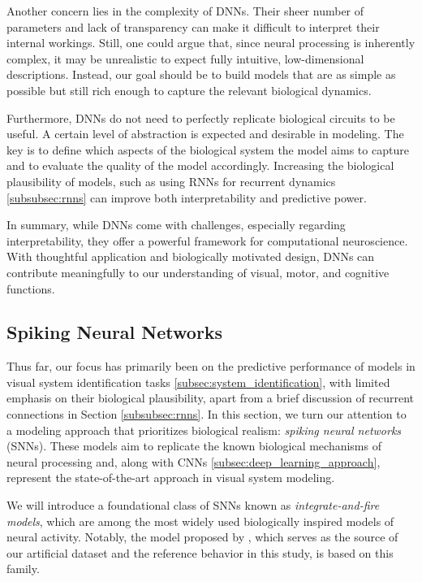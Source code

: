 Another concern lies in the complexity of DNNs. Their sheer number of parameters and lack of transparency can make it difficult to interpret their internal workings. Still, one could argue that, since neural processing is inherently complex, it may be unrealistic to expect fully intuitive, low-dimensional descriptions. Instead, our goal should be to build models that are as simple as possible but still rich enough to capture the relevant biological dynamics.

Furthermore, DNNs do not need to perfectly replicate biological circuits to be useful. A certain level of abstraction is expected and desirable in modeling. The key is to define which aspects of the biological system the model aims to capture and to evaluate the quality of the model accordingly. Increasing the biological plausibility of models, such as using RNNs for recurrent dynamics \ref{subsubsec:rnns} can improve both interpretability and predictive power.

In summary, while DNNs come with challenges, especially regarding interpretability, they offer a powerful framework for computational neuroscience. With thoughtful application and biologically motivated design, DNNs can contribute meaningfully to our understanding of visual, motor, and cognitive functions.

\subsection{Spiking Neural Networks}
\label{subsec:spiking_neural_nets}
Thus far, our focus has primarily been on the predictive performance of models in visual system identification tasks \ref{subsec:system_identification}, with limited emphasis on their biological plausibility, apart from a brief discussion of recurrent connections in Section \ref{subsubsec:rnns}. In this section, we turn our attention to a modeling approach that prioritizes biological realism: \emph{spiking neural networks} (SNNs). These models aim to replicate the known biological mechanisms of neural processing and, along with CNNs \ref{subsec:deep_learning_approach}, represent the state-of-the-art approach in visual system modeling.

We will introduce a foundational class of SNNs known as \emph{integrate-and-fire models}, which are among the most widely used biologically inspired models of neural activity. Notably, the model proposed by \citet{antolik2024comprehensive}, which serves as the source of our artificial dataset and the reference behavior in this study, is based on this family.

